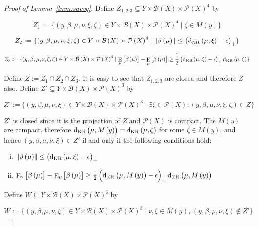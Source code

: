 \documentclass[11pt]{article}
\theoremstyle{definition}
\theoremstyle{plain}
\newcommand{\N}[1]{\lVert #1 \rVert}
\DeclareMathOperator{\E}{E}
\newcommand{\PM}{\mathcal{P}}
\newcommand{\DKR}{\operatorname{d}_{\textnormal{KR}}}
\newcommand{\Gm}{\mathcal{B}}
\begin{document}
\begin{proof}[Proof of Lemma~\ref{lmm:savvy}]

Define $Z_{1,2,3} \subseteq Y \times \Gm\left(X\right) \times \PM\left(X\right)^4$ by

$$Z_1:=\{\left(y,\beta,\mu,\nu,\xi,\zeta\right) \in Y \times \Gm\left(X\right) \times \PM\left(X\right)^4 \mid \zeta \in M\left(y\right)\}$$

$$Z_2:=\{\left(y,\beta,\mu,\nu,\xi,\zeta\right) \in Y \times \Gm\left(X\right) \times \PM\left(X\right)^4 \mid \N{\beta\left(\mu\right)} \leq \left(\DKR\left(\mu,\xi\right) - \epsilon\right)_+\}$$

$$Z_3:=\{\left(y,\beta,\mu,\nu,\xi,\zeta\right) \in Y \times \Gm\left(X\right) \times \PM\left(X\right)^4 \mid \E_\nu\left[\beta\left(\mu\right)\right] - \E_\mu\left[\beta\left(\mu\right)\right] \geq \frac{1}{2}\left(\DKR\left(\mu,\zeta\right) - \epsilon\right)_+ \DKR\left(\mu,\zeta\right)\}$$

Define $Z := Z_1 \cap Z_2 \cap Z_3$. It is easy to see that $Z_{1,2,3}$ are closed and therefore $Z$ also. Define $Z' \subseteq Y \times \Gm\left(X\right) \times \PM\left(X\right)^3$ by

$$Z':=\{\left(y,\beta,\mu,\nu,\xi\right) \in Y \times \Gm\left(X\right) \times \PM\left(X\right)^3 \mid \exists \zeta \in \PM\left(X\right): \left(y,\beta,\mu,\nu,\xi,\zeta\right) \in Z\}$$

$Z'$ is closed since it is the projection of $Z$ and $\PM\left(X\right)$ is compact. The $M\left(y\right)$ are compact, therefore $\DKR\left(\mu,M\left(y\right)\right)=\DKR\left(\mu,\zeta\right)$ for some $\zeta \in M\left(y\right)$, and hence $\left(y,\beta,\mu,\nu,\xi\right) \in Z'$ if and only if the following conditions hold:

\begin{enumerate}[i.]

\item $\N{\beta\left(\mu\right)} \leq \left(\DKR\left(\mu,\xi\right) - \epsilon\right)_+$
\item $\E_\nu\left[\beta\left(\mu\right)\right] - \E_\mu\left[\beta\left(\mu\right)\right] \geq \frac{1}{2}\left(\DKR\left(\mu,M\left(y\right)\right) - \epsilon\right)_+ \DKR\left(\mu,M\left(y\right)\right)$

\end{enumerate}

Define $W \subseteq Y \times \Gm\left(X\right) \times \PM\left(X\right)^3$ by

$$W:=\{\left(y,\beta,\mu,\nu,\xi\right) \in Y \times \Gm\left(X\right) \times \PM\left(X\right)^3 \mid \nu,\xi \in M\left(y\right),\, \left(y,\beta,\mu,\nu,\xi\right) \not\in Z'\}$$


\end{proof}
\end{document}
